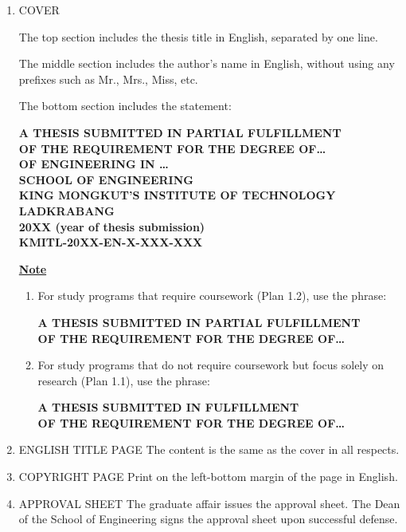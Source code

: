 \begin{enumerate}[label=\arabic*)]
    \item COVER

The top section includes the thesis title in English, separated by one line.

The middle section includes the author's name in English, without using any prefixes such as Mr., Mrs., Miss, etc.

The bottom section includes the statement:
\begin{center}
\textbf{A THESIS SUBMITTED IN PARTIAL FULFILLMENT}\\
\textbf{OF THE REQUIREMENT FOR THE DEGREE OF\ldots}\\
\textbf{OF ENGINEERING IN \ldots}\\
\textbf{SCHOOL OF ENGINEERING}\\
\textbf{KING MONGKUT'S INSTITUTE OF TECHNOLOGY LADKRABANG}\\
\textbf{20XX (year of thesis submission)}\\
\textbf{KMITL-20XX-EN-X-XXX-XXX}
\end{center}

\textbf{\underline{Note}}
\begin{enumerate}[label=\alph*)]
    \item For study programs that require coursework (Plan 1.2), use the phrase:
    \begin{center}
    \textbf{A THESIS SUBMITTED IN PARTIAL FULFILLMENT}\\
    \textbf{OF THE REQUIREMENT FOR THE DEGREE OF\ldots}
    \end{center}
    
    \item For study programs that do not require coursework but focus solely on research (Plan 1.1), use the phrase:
    \begin{center}
    \textbf{A THESIS SUBMITTED IN FULFILLMENT}\\
    \textbf{OF THE REQUIREMENT FOR THE DEGREE OF\ldots}
    \end{center}
\end{enumerate}

    \item ENGLISH TITLE PAGE The content is the same as the cover in all respects.

    \item COPYRIGHT PAGE Print on the left-bottom margin of the page in English.

    \item APPROVAL SHEET The graduate affair issues the approval sheet. The Dean of the School of Engineering signs the approval sheet upon successful defense.


\end{enumerate}
